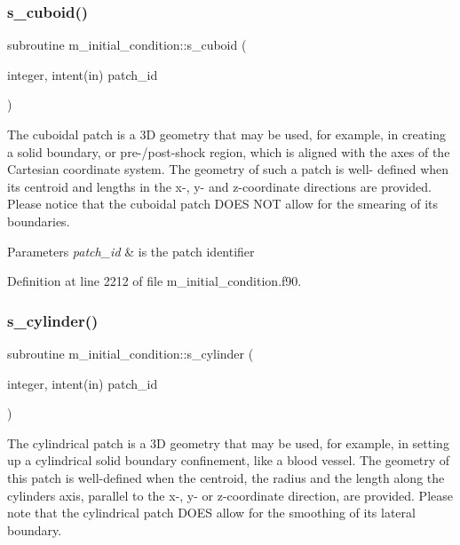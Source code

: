 \subsubsection{\texorpdfstring{s\+\_\+cuboid()}{s\_cuboid()}}
{\footnotesize\ttfamily subroutine m\+\_\+initial\+\_\+condition\+::s\+\_\+cuboid (\begin{DoxyParamCaption}\item[{integer, intent(in)}]{patch\+\_\+id }\end{DoxyParamCaption})}



The cuboidal patch is a 3D geometry that may be used, for example, in creating a solid boundary, or pre-\//post-\/shock region, which is aligned with the axes of the Cartesian coordinate system. The geometry of such a patch is well-\/ defined when its centroid and lengths in the x-\/, y-\/ and z-\/coordinate directions are provided. Please notice that the cuboidal patch D\+O\+ES N\+OT allow for the smearing of its boundaries. 


\begin{DoxyParams}{Parameters}
{\em patch\+\_\+id} & is the patch identifier \\
\hline
\end{DoxyParams}


Definition at line 2212 of file m\+\_\+initial\+\_\+condition.\+f90.

\mbox{\label{namespacem__initial__condition_af834c631376de6906fb6b002df70ce49}} 
\subsubsection{\texorpdfstring{s\+\_\+cylinder()}{s\_cylinder()}}
{\footnotesize\ttfamily subroutine m\+\_\+initial\+\_\+condition\+::s\+\_\+cylinder (\begin{DoxyParamCaption}\item[{integer, intent(in)}]{patch\+\_\+id }\end{DoxyParamCaption})}



The cylindrical patch is a 3D geometry that may be used, for example, in setting up a cylindrical solid boundary confinement, like a blood vessel. The geometry of this patch is well-\/defined when the centroid, the radius and the length along the cylinder\textquotesingle{}s axis, parallel to the x-\/, y-\/ or z-\/coordinate direction, are provided. Please note that the cylindrical patch D\+O\+ES allow for the smoothing of its lateral boundary. 


